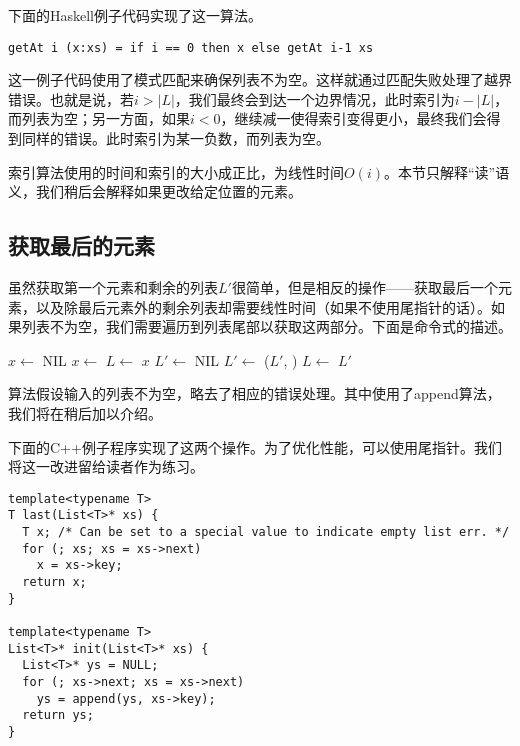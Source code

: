 \documentclass[UTF8]{article}
\begin{document}
下面的Haskell例子代码实现了这一算法。

\lstset{language=Haskell}
\begin{lstlisting}
getAt i (x:xs) = if i == 0 then x else getAt i-1 xs
\end{lstlisting}

这一例子代码使用了模式匹配来确保列表不为空。这样就通过匹配失败处理了越界错误。也就是说，若$i > |L|$，我们最终会到达一个边界情况，此时索引为$i - |L|$，而列表为空；另一方面，如果$i < 0$，继续减一使得索引变得更小，最终我们会得到同样的错误。此时索引为某一负数，而列表为空。

索引算法使用的时间和索引的大小成正比，为线性时间$O(i)$。本节只解释“读”语义，我们稍后会解释如果更改给定位置的元素。

\subsection{获取最后的元素}

虽然获取第一个元素和剩余的列表$L'$很简单，但是相反的操作——获取最后一个元素，以及除最后元素外的剩余列表却需要线性时间（如果不使用尾指针的话）。如果列表不为空，我们需要遍历到列表尾部以获取这两部分。下面是命令式的描述。

\begin{algorithmic}[1]
  \State $x \gets $ NIL
    \State $x \gets $ 
    \State $L \gets $ 
  \EndWhile
  \State \Return $x$
\EndFunction
\Statex
{}
  \State $L' \gets $ NIL
    \State $L' \gets$ ($L'$, )
    \State $L \gets $ 
  \EndWhile
  \State \Return $L'$
\EndFunction
\end{algorithmic}

算法假设输入的列表不为空，略去了相应的错误处理。其中使用了append算法，我们将在稍后加以介绍。

下面的C++例子程序实现了这两个操作。为了优化性能，可以使用尾指针。我们将这一改进留给读者作为练习。

\lstset{language=C++}
\begin{lstlisting}
template<typename T>
T last(List<T>* xs) {
  T x; /* Can be set to a special value to indicate empty list err. */
  for (; xs; xs = xs->next)
    x = xs->key;
  return x;
}

template<typename T>
List<T>* init(List<T>* xs) {
  List<T>* ys = NULL;
  for (; xs->next; xs = xs->next)
    ys = append(ys, xs->key);
  return ys;
}
\end{lstlisting}
\end{document}

